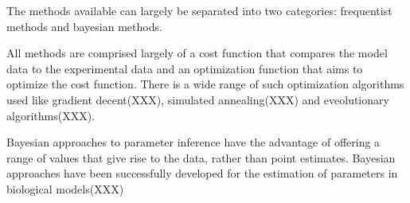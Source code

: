 The methods available can largely be separated into two categories: frequentist methods and bayesian methods. 


All methods are comprised largely of a cost function that compares the model data to the experimental data and an optimization function that aims to optimize the cost function. There is a wide range of such optimization algorithms used like gradient decent(XXX), simulated annealing(XXX) and eveolutionary algorithms(XXX). 

Bayesian approaches to parameter inference have the advantage of offering a range of values that give rise to the data, rather than point estimates. Bayesian approaches have been successfully developed for the estimation of parameters in biological models(XXX)

 








